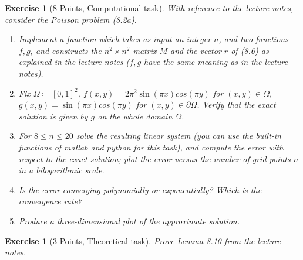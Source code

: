 \documentclass[11pt,a4paper,english,hyperref]{article}
\newcounter{aufgabeNummer}
\theoremstyle{break}   %
\newtheorem{Aufgabe}[aufgabeNummer]{Exercise}
\begin{document}
\begin{Aufgabe}[8 Points, Computational task]
  With reference to the lecture notes, consider the Poisson problem (8.2a).
  \begin{enumerate}
    \item Implement  a function which takes as input an integer $n$, and two functions $f,g$, and constructs the $n^2 \times n^2$ matrix $M$ and the vector $r$ of (8.6) as explained in the lecture notes ($f,g$ have the same meaning as in the lecture notes).
    \item Fix $\Omega \coloneqq [0,1]^{2}$, $f(x,y)=2\pi^2 \sin(\pi x) cos(\pi y)$ for $(x,y)\in\Omega$, $g(x,y)=\sin(\pi x) cos(\pi y)$ for $(x,y)\in\partial\Omega$. Verify that the exact solution is given by $g$ on the whole domain $\Omega$.
    \item For $8 \leq n \leq 20$ solve the resulting linear system (you can use the built-in functions of matlab and python for this task), and compute the error with respect to the exact solution; plot the error versus the number of grid points $n$ in a bilogarithmic scale.
    \item Is the error converging polynomially or exponentially? Which is the convergence rate?
    \item Produce a three-dimensional plot of the approximate solution.
  \end{enumerate}
\end{Aufgabe}

\begin{Aufgabe}[3 Points, Theoretical task]
  Prove Lemma 8.10 from the lecture notes.
\end{Aufgabe}
\end{document}
